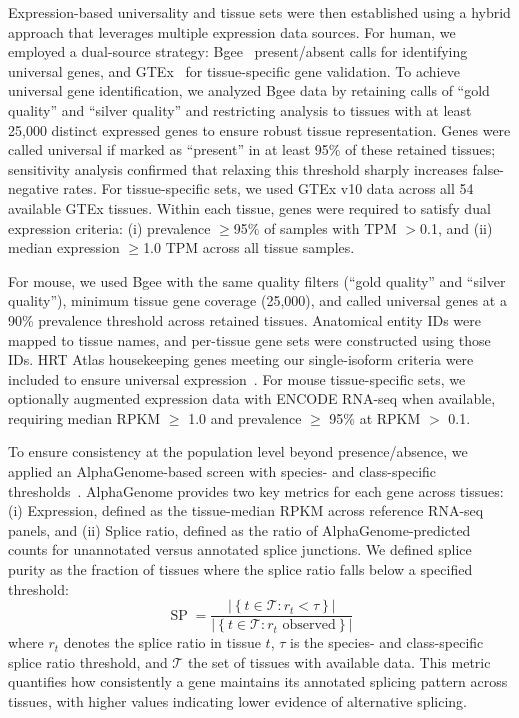 \documentclass[pdflatex,sn-nature]{sn-jnl}%
\begin{document}
Expression-based universality and tissue sets were then established using a hybrid approach that leverages multiple expression data sources. For human, we employed a dual-source strategy: Bgee~\cite{bastian_bgee_2021} present/absent calls for identifying universal genes, and GTEx~\cite{lonsdale_genotype-tissue_2013} for tissue-specific gene validation. To achieve universal gene identification, we analyzed Bgee data by retaining calls of ``gold quality'' and ``silver quality'' and restricting analysis to tissues with at least 25,000 distinct expressed genes to ensure robust tissue representation. Genes were called universal if marked as ``present'' in at least 95\% of these retained tissues; sensitivity analysis confirmed that relaxing this threshold sharply increases false-negative rates. For tissue-specific sets, we used GTEx v10 data across all 54 available GTEx tissues. Within each tissue, genes were required to satisfy dual expression criteria: (i) prevalence $\geq$95\% of samples with TPM $>$0.1, and (ii) median expression $\geq$1.0 TPM across all tissue samples.

For mouse, we used Bgee with the same quality filters (``gold quality'' and ``silver quality''), minimum tissue gene coverage (25,000), and called universal genes at a 90\% prevalence threshold across retained tissues. Anatomical entity IDs were mapped to tissue names, and per-tissue gene sets were constructed using those IDs. HRT Atlas housekeeping genes meeting our single-isoform criteria were included to ensure universal expression~\cite{hounkpe_hrt_2021}. For mouse tissue-specific sets, we optionally augmented expression data with ENCODE RNA-seq when available, requiring median RPKM $\geq$ 1.0 and prevalence $\geq$ 95\% at RPKM $>$ 0.1.

To ensure consistency at the population level beyond presence/absence, we applied an AlphaGenome-based screen with species- and class-specific thresholds~\cite{avsec_advancing_2026}. AlphaGenome provides two key metrics for each gene across tissues: (i) Expression, defined as the tissue-median RPKM across reference RNA-seq panels, and (ii) Splice ratio, defined as the ratio of AlphaGenome-predicted counts for unannotated versus annotated splice junctions. We defined splice purity as the fraction of tissues where the splice ratio falls below a specified threshold:
\begin{equation}
\operatorname{SP} = \frac{\left|\left\{ t \in \mathcal{T} : r_t < \tau \right\}\right|}{\left|\left\{ t \in \mathcal{T} : r_t \text{ observed}\right\}\right|}
\end{equation}
where $r_t$ denotes the splice ratio in tissue $t$, $\tau$ is the species- and class-specific splice ratio threshold, and $\mathcal{T}$ the set of tissues with available data. This metric quantifies how consistently a gene maintains its annotated splicing pattern across tissues, with higher values indicating lower evidence of alternative splicing.
\end{document}
